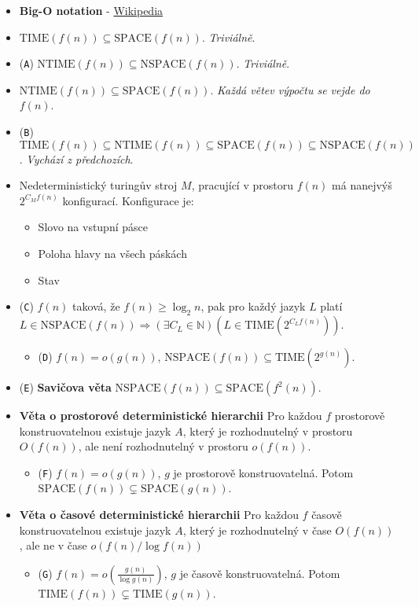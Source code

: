 \documentclass{article}
\newcommand{\TIME}[1]{\mathrm{TIME}(#1)}
\newcommand{\NTIME}[1]{\mathrm{NTIME}(#1)}
\newcommand{\SPACE}[1]{\mathrm{SPACE}(#1)}
\newcommand{\NSPACE}[1]{\mathrm{NSPACE}(#1)}
\theoremstyle{plain}
\theoremstyle{plain}
\theoremstyle{remark}
\begin{document}
\begin{itemize}
  \item \textbf{Big-O notation} - \href{https://en.wikipedia.org/wiki/Big_O_notation#Family_of_Bachmann%E2%80%93Landau_notations}{Wikipedia}
  \item $\TIME{f(n)} \subseteq \SPACE{f(n)}$. \emph{Triviálně}.
  \item (\texttt{A}) $\NTIME{f(n)} \subseteq \NSPACE{f(n)}$. \emph{Triviálně}.
  \item $\NTIME{f(n)} \subseteq \SPACE{f(n)}$. \emph{Každá větev výpočtu se vejde
  do $f(n)$}.

  \item (\texttt{B}) $\TIME{f(n)} \subseteq \NTIME{f(n)} \subseteq \SPACE{f(n)}
  \subseteq \NSPACE{f(n)}$. \emph{Vychází z předchozích}.

  \item Nedeterministický turingův stroj $M$, pracující v prostoru $f(n)$ má
  nanejvýš $2^{C_M f(n)}$ konfigurací. Konfigurace je:
  \begin{itemize}[noitemsep]
    \item Slovo na vstupní pásce
    \item Poloha hlavy na všech páskách
    \item Stav
  \end{itemize}

  \item (\texttt{C}) $f(n)$ taková, že $f(n) \geq \log_2n$, pak pro každý jazyk
  $L$ platí $L \in \NSPACE{f(n)} \Rightarrow (\exists C_L \in \mathbb{N}) (L \in
  \TIME{2^{C_L f(n)})}$.
  \begin{itemize}
    \item (\texttt{D}) $f(n) = o(g(n))$, $\NSPACE{f(n)} \subseteq
    \TIME{2^{g(n)}}$.
  \end{itemize}

  \item (\texttt{E}) \textbf{Savičova věta} $\NSPACE{f(n)} \subseteq
  \SPACE{f^2(n)}$.

  \item \textbf{Věta o prostorové deterministické hierarchii} Pro každou $f$
  prostorově konstruovatelnou existuje jazyk $A$, který je rozhodnutelný v
  prostoru $O(f(n))$, ale není rozhodnutelný v prostoru $o(f(n))$.
  \begin{itemize}
    \item (\texttt{F}) $f(n) = o(g(n))$, $g$ je prostorově konstruovatelná.
    Potom $\SPACE{f(n)} \subsetneq \SPACE{g(n)}$.
  \end{itemize}

  \item \textbf{Věta o časové deterministické hierarchii} Pro každou $f$
  časově konstruovatelnou existuje jazyk $A$, který je rozhodnutelný v čase
  $O(f(n))$, ale ne v čase $o(f(n)/\log f(n))$
  \begin{itemize}
    \item (\texttt{G}) $f(n) = o(\frac{g(n)}{\log g(n)})$, $g$ je časově
    konstruovatelná. Potom $\TIME{f(n)} \subsetneq \TIME{g(n)}$.
  \end{itemize}
\end{itemize}
\end{document}
